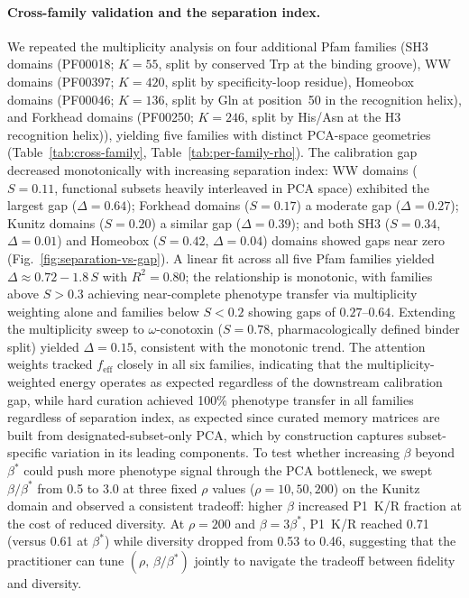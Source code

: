 \paragraph{Cross-family validation and the separation index.}
We repeated the multiplicity analysis on four additional Pfam families (SH3 domains (PF00018;
$K=55$, split by conserved Trp at the binding groove), WW domains (PF00397; $K=420$, split
by specificity-loop residue), Homeobox domains (PF00046; $K=136$, split by Gln at position~50
in the recognition helix), and Forkhead domains (PF00250; $K=246$, split by His/Asn at the
H3 recognition helix)), yielding five families with distinct PCA-space geometries
(Table~\ref{tab:cross-family}, Table~\ref{tab:per-family-rho}). The calibration gap decreased
monotonically with increasing separation index: WW domains ($S = 0.11$, functional subsets
heavily interleaved in PCA space) exhibited the largest gap ($\Delta = 0.64$); Forkhead domains
($S = 0.17$) a moderate gap ($\Delta = 0.27$); Kunitz domains ($S = 0.20$) a similar gap
($\Delta = 0.39$); and both SH3 ($S = 0.34$, $\Delta = 0.01$) and Homeobox ($S = 0.42$,
$\Delta = 0.04$) domains showed gaps near zero
(Fig.~\ref{fig:separation-vs-gap}). A linear fit across all five Pfam families yielded
$\Delta \approx 0.72 - 1.8\,S$ with $R^{2} = 0.80$; the relationship is monotonic, with
families above $S > 0.3$ achieving near-complete phenotype transfer via multiplicity weighting
alone and families below $S < 0.2$ showing gaps of $0.27$--$0.64$. Extending the multiplicity
sweep to $\omega$-conotoxin ($S = 0.78$, pharmacologically defined binder split) yielded
$\Delta = 0.15$, consistent with the monotonic trend. The attention weights tracked
$f_{\mathrm{eff}}$ closely in all six families, indicating that the multiplicity-weighted energy
operates as expected regardless of the downstream calibration gap, while hard curation achieved
100\% phenotype transfer in all families regardless of separation index, as expected since
curated memory matrices are built from designated-subset-only PCA, which by construction captures
subset-specific variation in its leading components. To test whether increasing $\beta$ beyond
$\beta^{*}$ could push more phenotype signal through the PCA bottleneck, we swept
$\beta/\beta^{*}$ from 0.5 to 3.0 at three fixed $\rho$ values ($\rho = 10, 50, 200$) on the
Kunitz domain and observed a consistent tradeoff: higher $\beta$ increased P1~K/R fraction at the
cost of reduced diversity. At $\rho = 200$ and $\beta = 3\beta^{*}$, P1~K/R reached 0.71
(versus 0.61 at $\beta^{*}$) while diversity dropped from 0.53 to 0.46, suggesting that the
practitioner can tune $(\rho,\, \beta/\beta^{*})$ jointly to navigate the tradeoff between fidelity and
diversity.


